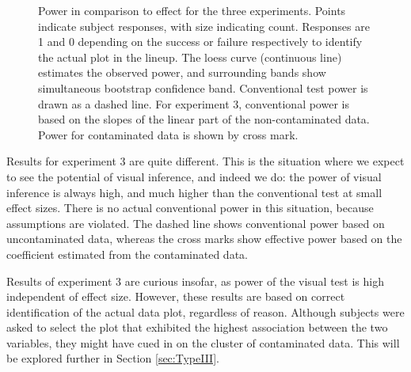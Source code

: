 \documentclass[12pt]{article}
\begin{document}
\begin{figure}[hbtp]
   \centering
       \caption{Power in comparison to effect for the three experiments. Points indicate subject responses, with size indicating count. Responses are 1 and 0 depending on the success or failure respectively to identify the actual plot in the lineup. The loess curve (continuous line) estimates the observed power, and surrounding bands show simultaneous bootstrap confidence band.  Conventional test power is drawn as a dashed line. For experiment 3, conventional power is based on the slopes of the linear part of the non-contaminated data. Power for contaminated data is shown by cross mark.}
       \label{fig:power_loess_effect}
\end{figure}

Results for experiment 3 are quite different. This is the situation where we expect to see the potential of visual inference, and indeed we do: the power of visual inference is always high, and much higher than the conventional test at small effect sizes. There is no actual conventional power in this situation, because assumptions are violated.
The dashed line shows conventional power based on uncontaminated data, whereas the cross marks show effective power based on the coefficient estimated from the contaminated data.
% 

Results of experiment 3 are curious insofar, as  power of the visual test is  high independent of effect size. However, these results are based on correct identification of the actual data plot, regardless of reason. Although subjects were asked to select the plot that exhibited the highest association between the two variables, they might have cued in on the cluster of contaminated data. This will be explored further in Section \ref{sec:TypeIII}. 
\end{document}
